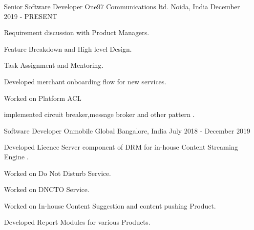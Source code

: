 

\begin{cventries}

  \cventry
    { Senior Software Developer } %
    {One97 Communications ltd.} %
    {Noida, India} %
    {December 2019 - PRESENT} %
    {
        \begin{cvitems} %
        \item { Requirement discussion with Product Managers.}
        \item { Feature Breakdown and High level Design.}
        \item { Task Assignment and Mentoring.}
        \item { Developed  merchant onboarding flow for new services.}
        \item { Worked on Platform ACL}
        \item { implemented  circuit breaker,message broker and other pattern  . }
      \end{cvitems}
    }

  \cventry
    { Software Developer } %
    {Onmobile Global} %
    {Bangalore, India} %
    {July 2018 - December 2019} %
    {
        \begin{cvitems} %
        \item { Developed Licence Server component of DRM for in-house Content Streaming Engine .}
        \item { Worked on Do Not Disturb Service.}
        \item { Worked on DNCTO Service. }
        \item { Worked on In-house Content Suggestion and content pushing  Product. }
        \item { Developed Report Modules for various Products.}
      \end{cvitems}
    }


\end{cventries}
